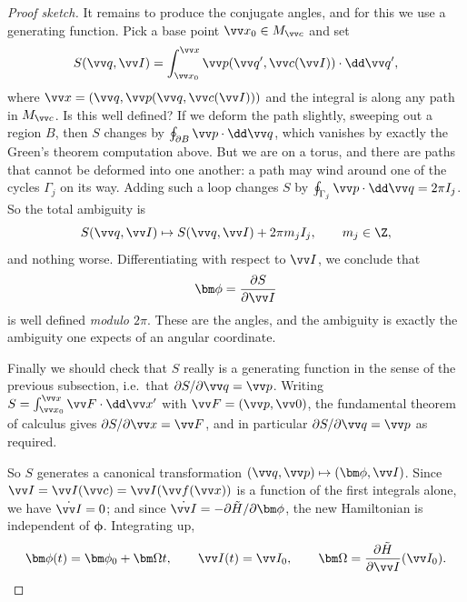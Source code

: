 \begin{proof}[Proof sketch]
	It remains to produce the conjugate angles, and for this we use a generating function. Pick a base point $\vv x_0 \in M_{\vv c}$ and set
	$$
	S(\vv q, \vv I) = \int_{\vv x_0}^{\vv x}\vv p(\vv q', \vv c(\vv I))\cdot\dd\vv q',
	$$
	where $\vv x = (\vv q, \vv p(\vv q, \vv c(\vv I)))$ and the integral is along any path in $M_{\vv c}$. Is this well defined? If we deform the path slightly, sweeping out a region $B$, then $S$ changes by $\oint_{\partial B}\vv p\cdot\dd\vv q$, which vanishes by exactly the Green's theorem computation above. But we are on a torus, and there are paths that cannot be deformed into one another: a path may wind around one of the cycles $\Gamma_j$ on its way. Adding such a loop changes $S$ by $\oint_{\Gamma_j}\vv p\cdot\dd\vv q = 2\pi I_j$. So the total ambiguity is
	$$
	S(\vv q, \vv I)\mapsto S(\vv q, \vv I) + 2\pi m_j I_j, \qquad m_j\in\Z,
	$$
	and nothing worse. Differentiating with respect to $\vv I$, we conclude that
	$$
	\bm\phi = \frac{\partial S}{\partial \vv I}
	$$
	is well defined \emph{modulo $2\pi$}. These are the angles, and the ambiguity is exactly the ambiguity one expects of an angular coordinate.

	Finally we should check that $S$ really is a generating function in the sense of the previous subsection, i.e.\ that $\partial S/\partial \vv q = \vv p$. Writing $S = \int_{\vv x_0}^{\vv x}\vv F\cdot\dd\vv x'$ with $\vv F = (\vv p, \vv 0)$, the fundamental theorem of calculus gives $\partial S/\partial\vv x = \vv F$, and in particular $\partial S/\partial \vv q = \vv p$ as required.

	So $S$ generates a canonical transformation $(\vv q, \vv p)\mapsto(\bm\phi, \vv I)$. Since $\vv I = \vv I(\vv c) = \vv I(\vv f(\vv x))$ is a function of the first integrals alone, we have $\dot{\vv I} = 0$; and since $\dot{\vv I} = -\partial\tilde H/\partial\bm\phi$, the new Hamiltonian is independent of $\bm\phi$. Integrating up,
	$$
	\bm\phi(t) = \bm\phi_0 + \bm\Omega t, \qquad \vv I(t) = \vv I_0, \qquad \bm\Omega = \frac{\partial \tilde H}{\partial \vv I}(\vv I_0). \qedhere
	$$
\end{proof}

